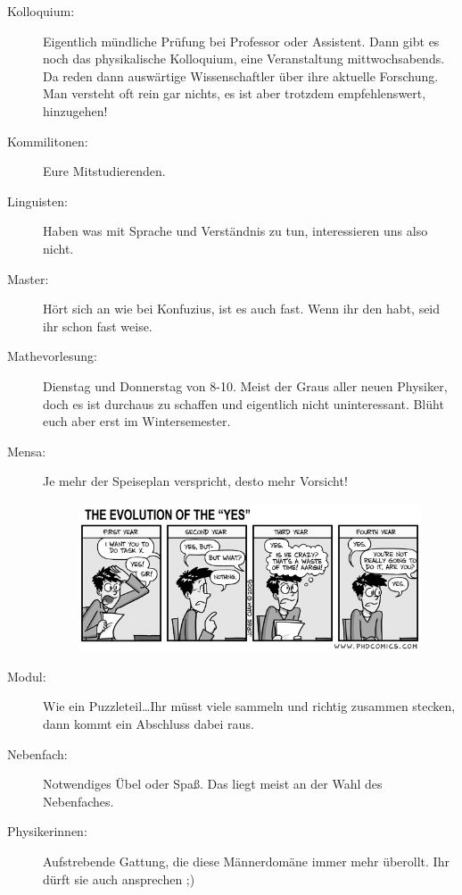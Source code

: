 \begin{description}
    \item[Kolloquium:] Eigentlich mündliche Prüfung bei Professor oder Assistent.
    Dann gibt es noch das physikalische Kolloquium, eine Veranstaltung mittwochsabends.
Da reden dann auswärtige Wissenschaftler über ihre aktuelle Forschung.
Man versteht oft rein gar nichts, es ist aber trotzdem empfehlenswert, hinzugehen!

    \item[Kommilitonen:] Eure Mitstudierenden.

\item[Linguisten:] Haben was mit Sprache und Verständnis zu tun, interessieren uns also nicht.

\item[Master:] Hört sich an wie bei Konfuzius, ist es auch fast.
Wenn ihr den habt, seid ihr schon fast weise.

    \item[Mathevorlesung:] Dienstag und Donnerstag von 8-10.
 Meist der Graus aller neuen Physiker, doch es
ist durchaus zu schaffen und eigentlich nicht uninteressant.
Blüht euch aber erst im Wintersemester.

    \item[Mensa:] Je mehr der Speiseplan verspricht, desto mehr Vorsicht!

\begin{figure}[!h]
 	\centering
  	\includegraphics[width=\textwidth]{bilder/yes.jpg}
\end{figure}

\item[Modul:] Wie ein Puzzleteil\ldots Ihr müsst viele sammeln und richtig zusammen stecken, dann kommt ein Abschluss dabei raus.

    \item[Nebenfach:] Notwendiges Übel oder Spaß.
    Das liegt meist an der Wahl des Nebenfaches.

    \item[Physikerinnen:] Aufstrebende Gattung, die diese Männerdomäne immer mehr überollt.
    Ihr dürft sie auch ansprechen ;)


\end{description}
